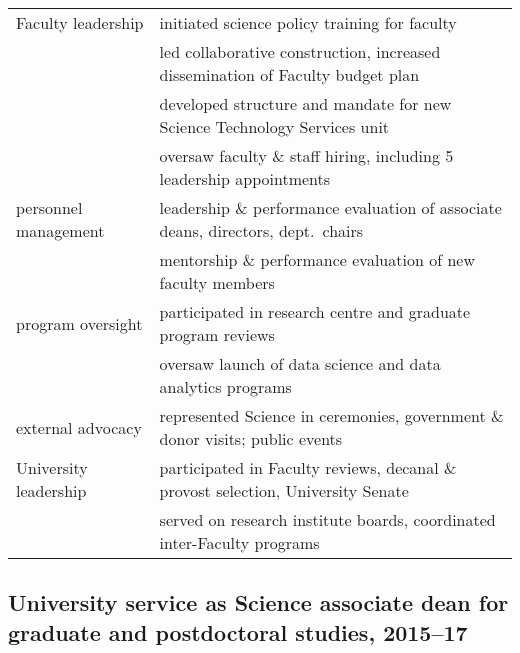 \begin{tabularx}{\textwidth}{lX}
Faculty leadership & initiated science policy training for faculty \\
& led collaborative construction, increased dissemination of Faculty budget plan\\
& developed structure and mandate for new Science Technology Services unit\\
& oversaw faculty \& staff hiring, including 5 leadership appointments \\
personnel management & leadership \& performance evaluation of associate deans, directors, dept.\ chairs\\
&mentorship  \& performance evaluation of new faculty members\\
program oversight & participated in research centre and graduate program reviews\\ 
& oversaw launch of data science and data analytics programs\\
external advocacy & represented Science in ceremonies, government \& donor visits; public events \\
University leadership  &  participated in Faculty reviews, decanal \& provost selection, University Senate \\
 & served on research institute boards, coordinated  inter-Faculty programs\\
\end{tabularx}


\subsection{University service as Science associate dean for graduate and postdoctoral studies, 2015--17}

